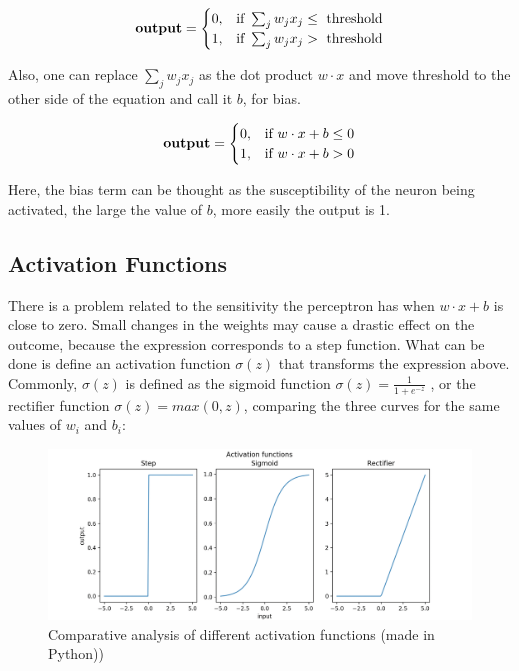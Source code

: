 \begin{equation}
	\mbox{\textbf{output}} = \begin{cases} 0, & \mbox{if } \sum_j w_j x_j \le \mbox{ threshold} \\ 1, & \mbox{if } \sum_j w_j x_j > \mbox{ threshold} \end{cases}
\end{equation}

Also, one can replace $ \sum_j w_j x_j$ as the dot product $w \cdot x $ and move threshold to the other side of the equation and call it $b$, for bias.

\begin{equation}
	\mbox{\textbf{output}} = \begin{cases} 0, & \mbox{if } w \cdot x + b \le 0 \\ 1, & \mbox{if }  w \cdot x + b > 0 \end{cases}
\end{equation}

Here, the bias term can be thought as the susceptibility of the neuron being activated, the large the value of $b$, more easily the output is 1. 

\subsection{Activation Functions}
There is a problem related to the sensitivity the perceptron has when $w \cdot x + b $ is close to zero. Small changes in the weights may cause a drastic effect on the outcome, because the expression corresponds to a step function. What can be done is define an activation function $\sigma(z)$ that transforms the expression above. Commonly,  $\sigma(z)$ is defined as the sigmoid function $\sigma(z) = \frac{1}{1+e^{-z}}$ , or the rectifier function $\sigma(z) = max(0,z) $, comparing the three curves for the same values of $w_i$ and $b_i$:

\begin{figure}[H]
	\centering
	\includegraphics[scale=1, width=\linewidth]{figures/activationfunc.png}
	\caption{Comparative analysis of different activation functions (made in Python))}
	\label{activation}
\end{figure} 

